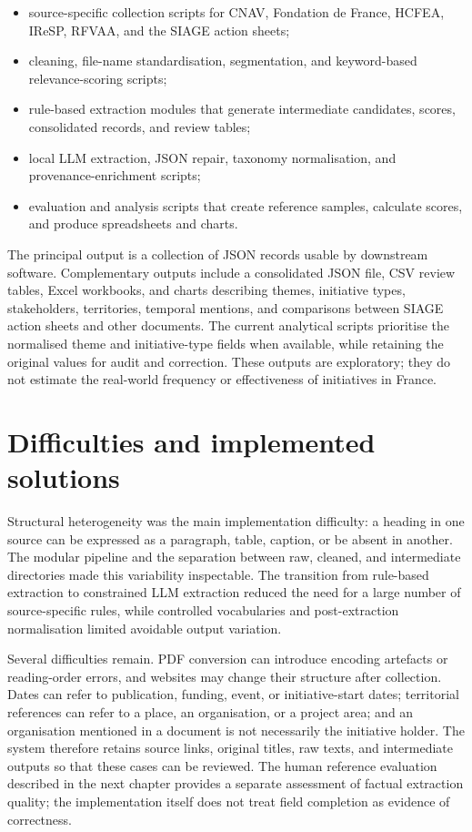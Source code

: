 \documentclass[
11pt,
english,
singlespacing,
headsepline,
]{MastersDoctoralThesis}
\begin{document}
\begin{itemize}
    \item source-specific collection scripts for CNAV, Fondation de France,
    HCFEA, IReSP, RFVAA, and the SIAGE action sheets;
    \item cleaning, file-name standardisation, segmentation, and
    keyword-based relevance-scoring scripts;
    \item rule-based extraction modules that generate intermediate candidates,
    scores, consolidated records, and review tables;
    \item local LLM extraction, JSON repair, taxonomy normalisation, and
    provenance-enrichment scripts;
    \item evaluation and analysis scripts that create reference samples,
    calculate scores, and produce spreadsheets and charts.
\end{itemize}

The principal output is a collection of JSON records usable by downstream
software. Complementary outputs include a consolidated JSON file, CSV review
tables, Excel workbooks, and charts describing themes, initiative types,
stakeholders, territories, temporal mentions, and comparisons between SIAGE
action sheets and other documents. The current analytical scripts prioritise
the normalised theme and initiative-type fields when available, while retaining
the original values for audit and correction. These outputs are exploratory;
they do not estimate the real-world frequency or effectiveness of initiatives
in France.

\section{Difficulties and implemented solutions}

Structural heterogeneity was the main implementation difficulty: a heading in
one source can be expressed as a paragraph, table, caption, or be absent in
another. The modular pipeline and the separation between raw, cleaned, and
intermediate directories made this variability inspectable. The transition from
rule-based extraction to constrained LLM extraction reduced the need for a
large number of source-specific rules, while controlled vocabularies and
post-extraction normalisation limited avoidable output variation.

Several difficulties remain. PDF conversion can introduce encoding artefacts or
reading-order errors, and websites may change their structure after collection.
Dates can refer to publication, funding, event, or initiative-start dates;
territorial references can refer to a place, an organisation, or a project
area; and an organisation mentioned in a document is not necessarily the
initiative holder. The system therefore retains source links, original titles,
raw texts, and intermediate outputs so that these cases can be reviewed. The
human reference evaluation described in the next chapter provides a separate
assessment of factual extraction quality; the implementation itself does not
treat field completion as evidence of correctness.
\end{document}
